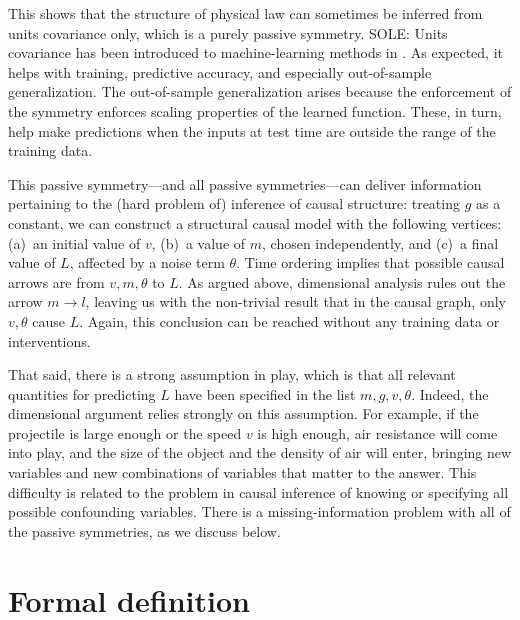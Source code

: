 \documentclass{article}
\theoremstyle{plain}
\theoremstyle{definition}
\theoremstyle{remark}
\begin{document}
This shows that the structure of physical law can sometimes be inferred from units covariance only, which is a purely passive symmetry.
SOLE: Units covariance has been introduced to machine-learning methods in \cite{villar2022dimensionless, 
SOLE-OTHERS}.
As expected, it helps with training, predictive accuracy, and especially out-of-sample generalization.
The out-of-sample generalization arises because the enforcement of the symmetry enforces scaling properties of the learned function.
These, in turn, help make predictions when the inputs at test time are outside the range of the training data.

This passive symmetry---and all passive symmetries---can deliver information pertaining to the (hard problem of) inference of causal structure:
treating $g$ as a constant, we can construct a structural causal model with the following vertices: (a)~an initial value of $v$, (b)~a value of $m$, chosen independently, and (c)~a final value of $L$, affected by a noise term $\theta$.
Time ordering implies that possible causal arrows are from $v, m, \theta$ to $L$.
As argued above, dimensional analysis rules out the arrow $m\to l$, leaving us with the non-trivial result that in the causal graph, only $v,\theta$ cause $L$.
Again, this conclusion can be reached without any training data or interventions.

That said, there is a strong assumption in play, which is that all relevant quantities for predicting $L$ have been specified in the list $m, g, v, \theta$.
Indeed, the dimensional argument relies strongly on this assumption.
For example, if the projectile is large enough or the speed $v$ is high enough, air resistance will come into play, and the size of the object and the density of air will enter, bringing new variables and new combinations of variables that matter to the answer.
This difficulty is related to the problem in causal inference of knowing or specifying all possible confounding variables.
There is a missing-information problem with all of the passive symmetries, as we discuss below.

\section{Formal definition}\label{sec:definitions}
\end{document}
